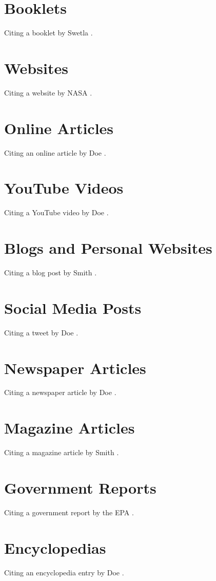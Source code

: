 \documentclass{article}
\begin{document}
\section{Booklets}
Citing a booklet by Swetla \cite{swetla2015}.

\section{Websites}
Citing a website by NASA \cite{nasa2015}.

\section{Online Articles}
Citing an online article by Doe \cite{doe2022}.

\section{YouTube Videos}
Citing a YouTube video by Doe \cite{doe2021}.

\section{Blogs and Personal Websites}
Citing a blog post by Smith \cite{smith2020}.

\section{Social Media Posts}
Citing a tweet by Doe \cite{doe_twitter2021}.

\section{Newspaper Articles}
Citing a newspaper article by Doe \cite{doe2021_newspaper}.

\section{Magazine Articles}
Citing a magazine article by Smith \cite{smith2020_magazine}.

\section{Government Reports}
Citing a government report by the EPA \cite{epa2019}.

\section{Encyclopedias}
Citing an encyclopedia entry by Doe \cite{doe2020_encyclopedia}.
\end{document}
